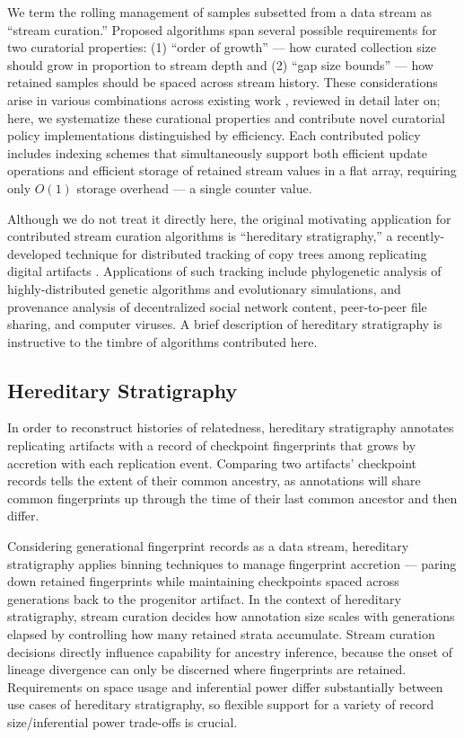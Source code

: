 We term the rolling management of samples subsetted from a data stream as ``stream curation.''
Proposed algorithms span several possible requirements for two curatorial properties: (1) ``order of growth'' --- how curated collection size should grow in proportion to stream depth and (2) ``gap size bounds'' --- how retained samples should be spaced across stream history.
These considerations arise in various combinations across existing work \citep{aggarwal2003framework,han2005stream}, reviewed in detail later on;
here, we systematize these curational properties and contribute novel curatorial policy implementations distinguished by efficiency.
Each contributed policy includes indexing schemes that simultaneously support both efficient update operations and efficient storage of retained stream values in a flat array, requiring only $O(1)$ storage overhead --- a single counter value.

Although we do not treat it directly here, the original motivating application for contributed stream curation algorithms is ``hereditary stratigraphy,'' a recently-developed technique for distributed tracking of copy trees among replicating digital artifacts \citep{moreno2022hereditary}.
Applications of such tracking include phylogenetic analysis of highly-distributed genetic algorithms and evolutionary simulations, and provenance analysis of decentralized social network content, peer-to-peer file sharing, and computer viruses.
A brief description of hereditary stratigraphy is instructive to the timbre of algorithms contributed here.

\subsection{Hereditary Stratigraphy}

In order to reconstruct histories of relatedness, hereditary stratigraphy annotates replicating artifacts with a record of checkpoint fingerprints that grows by accretion with each replication event.
Comparing two artifacts' checkpoint records tells the extent of their common ancestry, as annotations will share common fingerprints up through the time of their last common ancestor and then differ.

Considering generational fingerprint records as a data stream, hereditary stratigraphy applies binning techniques to manage fingerprint accretion --- paring down retained fingerprints while maintaining checkpoints spaced across generations back to the progenitor artifact.
In the context of hereditary stratigraphy, stream curation decides how annotation size scales with generations elapsed by controlling how many retained strata accumulate.
Stream curation decisions directly influence capability for ancestry inference, because the onset of lineage divergence can only be discerned where fingerprints are retained.
Requirements on space usage and inferential power differ substantially between use cases of hereditary stratigraphy, so flexible support for a variety of record size/inferential power trade-offs is crucial.

